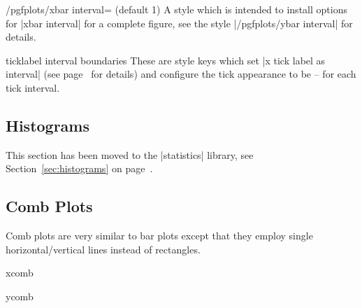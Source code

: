 {\begin{stylekey}{/pgfplots/xbar interval= (default 1)}
	A style which is intended to install options for |xbar interval| for a complete figure, see the style |/pgfplots/ybar interval| for details.
\end{stylekey}

\begin{pgfplotsxykey}{\x ticklabel interval boundaries}
	These are style keys which set |x tick label as interval| (see page~\pageref{key:pgfplots:ticklabelasinterval} for details) and configure the tick appearance to be  --  for each tick interval.
\end{pgfplotsxykey}

\subsection{Histograms}
This section has been moved to the |statistics| library, see Section~\ref{sec:histograms} on page~\pageref{sec:histograms}.

\subsection{Comb Plots}
Comb plots are very similar to bar plots except that they employ single horizontal/vertical lines instead of rectangles.

\begin{plottype}{xcomb}
\begin{codeexample}[]
\end{codeexample}
\end{plottype}

\begin{plottype}{ycomb}
\begin{codeexample}[]
\end{codeexample}
\end{plottype}

}
